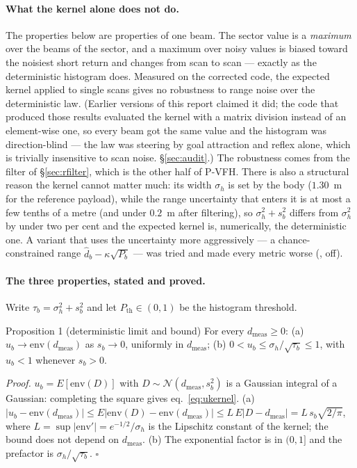 \paragraph{What the kernel alone does not do.} The properties below are
properties of one beam. The sector value is a \emph{maximum} over the
beams of the sector, and a maximum over noisy values is biased toward the
noisiest short return and changes from scan to scan --- exactly as the
deterministic histogram does. Measured on the corrected code, the
expected kernel applied to single scans gives no robustness to range
noise over the deterministic law. (Earlier versions of this report
claimed it did; the code that produced those results evaluated the kernel
with a matrix division instead of an element-wise one, so every beam got
the same value and the histogram was direction-blind --- the law was
steering by goal attraction and reflex alone, which is trivially
insensitive to scan noise. \S\ref{sec:audit}.) The robustness comes from
the filter of \S\ref{sec:rfilter}, which is the other half of P-VFH.
There is also a structural reason the kernel cannot matter much: its
width $\sigma_h$ is set by the body ($1.30$~m for the reference payload),
while the range uncertainty that enters it is at most a few tenths of a
metre (and under $0.2$~m after filtering), so
$\sigma_h^2 + s_b^2$ differs from $\sigma_h^2$ by under two per cent and
the expected kernel is, numerically, the deterministic one. A variant
that uses the uncertainty more aggressively --- a chance-constrained
range $\hat d_b - \kappa\sqrt{P_b}$ --- was tried and made every metric
worse (, off).

\paragraph{The three properties, stated and proved.} Write
$\tau_b = \sigma_h^2 + s_b^2$ and let $P_{\mathrm{th}} \in (0,1)$ be the
histogram threshold.

\begin{keybox}{Proposition 1 (deterministic limit and bound)}
For every $d_{\mathrm{meas}} \ge 0$: (a) $u_b \to
\mathrm{env}(d_{\mathrm{meas}})$ as $s_b \to 0$, uniformly in
$d_{\mathrm{meas}}$; (b) $0 < u_b \le \sigma_h/\sqrt{\tau_b} \le 1$, with
$u_b < 1$ whenever $s_b > 0$.
\end{keybox}
\emph{Proof.} $u_b = E[\mathrm{env}(D)]$ with $D \sim
\mathcal{N}(d_{\mathrm{meas}}, s_b^2)$ is a Gaussian integral of a Gaussian:
completing the square gives eq.~\eqref{eq:ukernel}. (a)
$\lvert u_b - \mathrm{env}(d_{\mathrm{meas}}) \rvert \le
E\lvert \mathrm{env}(D) - \mathrm{env}(d_{\mathrm{meas}}) \rvert \le
L\, E\lvert D - d_{\mathrm{meas}} \rvert = L\, s_b \sqrt{2/\pi}$, where
$L = \sup \lvert \mathrm{env}' \rvert = e^{-1/2}/\sigma_h$ is the Lipschitz
constant of the kernel; the bound does not depend on $d_{\mathrm{meas}}$.
(b) The exponential factor is in $(0, 1]$ and the prefactor is
$\sigma_h/\sqrt{\tau_b}$. $\square$

